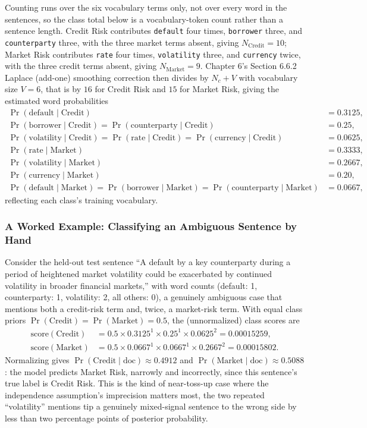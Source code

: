 \documentclass[../ai_in_finance]{subfiles}
\begin{document}
Counting runs over the six vocabulary terms only, not over every word in the sentences, so the class total below is a vocabulary-token count rather than a sentence length. Credit Risk contributes \texttt{default} four times, \texttt{borrower} three, and \texttt{counterparty} three, with the three market terms absent, giving $N_{\text{Credit}} = 10$; Market Risk contributes \texttt{rate} four times, \texttt{volatility} three, and \texttt{currency} twice, with the three credit terms absent, giving $N_{\text{Market}} = 9$. Chapter 6's Section 6.6.2 Laplace (add-one) smoothing correction then divides by $N_c + V$ with vocabulary size $V = 6$, that is by $16$ for Credit Risk and $15$ for Market Risk, giving the estimated word probabilities
\begin{align*}
\Pr(\text{default}\mid\text{Credit}) &= 0.3125, \\
\Pr(\text{borrower}\mid\text{Credit}) = \Pr(\text{counterparty}\mid\text{Credit}) &= 0.25, \\
\Pr(\text{volatility}\mid\text{Credit}) = \Pr(\text{rate}\mid\text{Credit}) = \Pr(\text{currency}\mid\text{Credit}) &= 0.0625, \\[4pt]
\Pr(\text{rate}\mid\text{Market}) &= 0.3333, \\
\Pr(\text{volatility}\mid\text{Market}) &= 0.2667, \\
\Pr(\text{currency}\mid\text{Market}) &= 0.20, \\
\Pr(\text{default}\mid\text{Market}) = \Pr(\text{borrower}\mid\text{Market}) = \Pr(\text{counterparty}\mid\text{Market}) &= 0.0667,
\end{align*}
reflecting each class's training vocabulary.

\subsubsection*{A Worked Example: Classifying an Ambiguous Sentence by Hand}

Consider the held-out test sentence ``A default by a key counterparty during a period of heightened market volatility could be exacerbated by continued volatility in broader financial markets,'' with word counts (default: 1, counterparty: 1, volatility: 2, all others: 0), a genuinely ambiguous case that mentions both a credit-risk term and, twice, a market-risk term. With equal class priors $\Pr(\text{Credit}) = \Pr(\text{Market}) = 0.5$, the (unnormalized) class scores are
\begin{align*}
\text{score}(\text{Credit}) &= 0.5 \times 0.3125^1 \times 0.25^1 \times 0.0625^2 = 0.00015259, \\
\text{score}(\text{Market}) &= 0.5 \times 0.0667^1 \times 0.0667^1 \times 0.2667^2 = 0.00015802.
\end{align*}
Normalizing gives $\Pr(\text{Credit}\mid\text{doc}) \approx 0.4912$ and $\Pr(\text{Market}\mid\text{doc}) \approx 0.5088$: the model predicts Market Risk, narrowly and incorrectly, since this sentence's true label is Credit Risk. This is the kind of near-toss-up case where the independence assumption's imprecision matters most, the two repeated ``volatility'' mentions tip a genuinely mixed-signal sentence to the wrong side by less than two percentage points of posterior probability.
\end{document}
